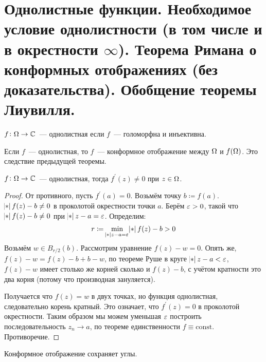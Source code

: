 \section{Однолистные функции. Необходимое условие однолистности (в том числе и в окрестности $\infty$). Теорема Римана о конформных отображениях (без доказательства). Обобщение теоремы Лиувилля.}

\begin{definition}
    $f\colon \Omega \to \mathbb{C}$~--- однолистная если
    $f$~--- голоморфна и инъективна.
\end{definition}

\begin{observation}
    Если $f$~--- однолистная,
    то $f$~--- конформное отображение между
    $\Omega$ и $f(\Omega)$.
    Это следствие предыдущей теоремы. 
\end{observation}

\begin{theorem}
    $f\colon \Omega \to \mathbb{C}$~--- однолистная,
    тогда $f^\prime(z) \ne 0$ при $z \in \Omega$.
\end{theorem}

\begin{proof}
    От противного, пусть $f^\prime(a) = 0$.
    Возьмём точку $b \coloneqq f(a)$.
    $\abs{f(z) - b} \ne 0$ в проколотой окрестности точки $a$.
    Берём $\varepsilon > 0$, такой что $\abs{f(z) - b} \ne 0$
    при $\abs{z-a} = \ve$. Определим:
    \begin{gather*}
        r \coloneqq \min\limits_{\abs{z-a} = \ve} \abs{f(z) - b} > 0
    \end{gather*}
    Возьмём $w \in B_{r/2}(b)$.
    Рассмотрим уравнение $f(z) - w = 0$.
    Опять же, $f(z) - w = f(z) - b + b - w$,
    по теореме Руше в круге $\abs{z-a} < \ve$,
    $f(z)-w$ имеет столько же корней сколько и
    $f(z)-b$, с учётом кратности это два корня
    (потому что производная зануляется).

    Получается что $f(z) = w$ в двух точках,
    но функция однолистная, следовательно корень кратный.
    Это означает, что $f^\prime(z) = 0$ в проколотой окрестности.
    Таким образом мы можем уменьшая $\varepsilon$ построить
    последовательность $z_n \to a$, по теореме единственности
    $f \equiv \mathrm{const}$. Противоречие.
\end{proof}

\begin{consequence}
    Конформное отображение сохраняет углы.
\end{consequence}

